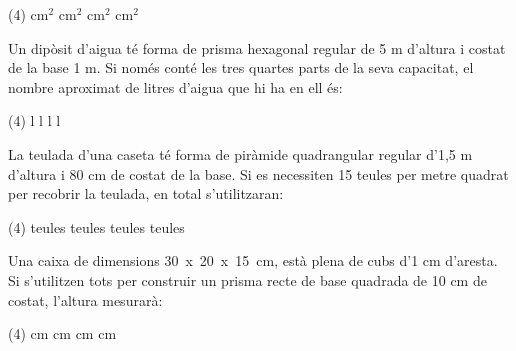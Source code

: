 \begin{autoaval}{55}
\begin{mylist}
\begin{tasks}(4)
	 cm${}^{2}$    
	 cm${}^{2}$   
	 cm${}^{2}$   
	 cm${}^{2}$
\end{tasks}


\exer  Un dipòsit d'aigua té forma de prisma hexagonal regular de 5 m d'altura i costat de la base 1 m. Si només conté les tres quartes parts de la seva capacitat, el nombre aproximat de litres d'aigua que hi ha en ell és:

\begin{tasks}(4)
	 l    
	 l   
	 l 
	 l
\end{tasks}


\exer  La teulada d'una caseta té forma de piràmide quadrangular regular d'1,5 m d'altura i 80 cm de costat de la base. Si es necessiten 15 teules per metre quadrat per recobrir la teulada, en total s'utilitzaran: 

\begin{tasks}(4)
	 teules   
	 teules   
	 teules 
	 teules
\end{tasks}

	\exer  Una caixa de dimensions 30~x~20~x~15~cm, està plena de cubs d'1 cm d'aresta. Si s'utilitzen tots per construir un prisma recte de base quadrada de 10 cm de costat, l'altura mesurarà:

\begin{tasks}(4)
	 cm    
	 cm   
	 cm   
	 cm
\end{tasks}


\end{mylist}
\end{autoaval}
\newpage

